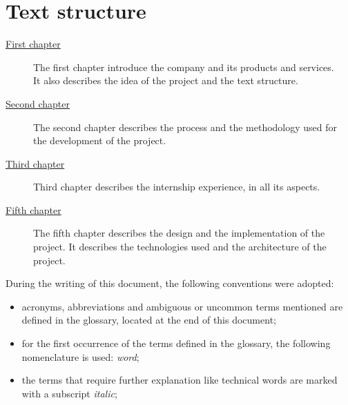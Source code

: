 \section{Text structure}

\begin{description}
    \item[{\hyperref[cap:Introduction]{First chapter}}] 
    The first chapter introduce the company and its products and services.\\
    It also describes the idea of the project and the text structure.

    \item[{\hyperref[cap:descrizione-stage]{Second chapter}}] The second chapter describes the process and the methodology used for the development of the project.
    
    \item[{\hyperref[cap:process-methodologies]{Third chapter}}] Third chapter describes the internship experience, in all its aspects.
    
    \item[{\hyperref[cap:design-coding]{Fifth chapter}}] The fifth chapter describes the design and the implementation of the project.
    It describes the technologies used and the architecture of the project.
    
\end{description}

During the writing of this document, the following conventions were adopted:
\begin{itemize}
    \item acronyms, abbreviations and ambiguous or uncommon terms mentioned are defined in the glossary, located at the end of this document;
    \item for the first occurrence of the terms defined in the glossary, the following nomenclature is used: \emph{word}\glsfirstoccur;
	\item the terms that require further explanation like technical words are marked with a subscript \emph{italic};
\end{itemize}
